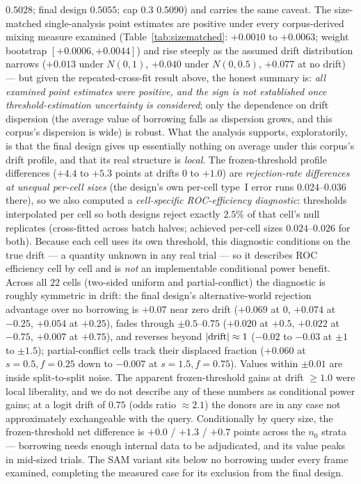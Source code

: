 \documentclass[11pt]{article}
\begin{document}
$0.5028$; final design $0.5055$; cap $0.3$ $0.5090$) and carries the same
caveat. The size-matched
single-analysis point estimates are positive under every corpus-derived
mixing measure examined
(Table~\ref{tab:sizematched}: $+0.0010$ to $+0.0063$; weight bootstrap
$[+0.0006, +0.0044]$) and rise steeply as the assumed
drift distribution narrows ($+0.013$ under $N(0,1)$, $+0.040$ under
$N(0,0.5)$, $+0.077$ at no drift) --- but given the repeated-cross-fit
result above, the honest summary is: \emph{all examined point estimates
were positive, and the sign is not established once threshold-estimation
uncertainty is considered}; only the dependence on drift dispersion (the
average value of borrowing falls as dispersion grows, and this corpus's
dispersion is wide) is robust. What the analysis supports,
exploratorily, is that the final design gives up essentially nothing on
average under this corpus's drift profile, and that its real structure is
\emph{local}. The frozen-threshold profile differences
($+4.4$ to $+5.3$ points at drifts $0$ to $+1.0$) are \emph{rejection-rate
differences at unequal per-cell sizes} (the design's own per-cell type~I
error runs $0.024$--$0.036$ there), so we also computed a
\emph{cell-specific ROC-efficiency diagnostic}: thresholds interpolated
per cell so both designs reject exactly
$2.5\%$ of that cell's null replicates (cross-fitted across batch halves;
achieved per-cell sizes $0.024$--$0.026$ for both). Because each cell
uses its own threshold, this diagnostic conditions on the true drift ---
a quantity unknown in any real trial --- so it describes ROC efficiency
cell by cell and is \emph{not} an implementable conditional power
benefit. Across all $22$ cells (two-sided uniform and partial-conflict)
the diagnostic is roughly symmetric in drift: the final design's
alternative-world rejection advantage over no borrowing is $+0.07$ near
zero drift ($+0.069$ at $0$, $+0.074$ at $-0.25$, $+0.054$ at $+0.25$),
fades through $\pm 0.5$--$0.75$ ($+0.020$ at $+0.5$, $+0.022$ at
$-0.75$, $+0.007$ at $+0.75$), and reverses beyond $|{\rm drift}|
\approx 1$ ($-0.02$ to $-0.03$ at $\pm 1$ to $\pm 1.5$); partial-conflict
cells track their displaced fraction ($+0.060$ at $s{=}0.5, f{=}0.25$
down to $-0.007$ at $s{=}1.5, f{=}0.75$). Values within $\pm 0.01$ are
inside split-to-split noise. The apparent frozen-threshold gains at
drift $\ge 1.0$ were local liberality, and we do not describe any of
these numbers as conditional power gains; at a logit drift of $0.75$
(odds ratio $\approx 2.1$) the donors are in any case not approximately
exchangeable with the query.
Conditionally by query size, the frozen-threshold net difference
is $+0.0$ / $+1.3$ / $+0.7$ points across the $n_0$ strata --- borrowing
needs enough internal data to be adjudicated, and its value peaks in
mid-sized trials. The SAM variant sits below no borrowing under every
frame examined, completing the measured case for its exclusion from the
final design.
\end{document}
